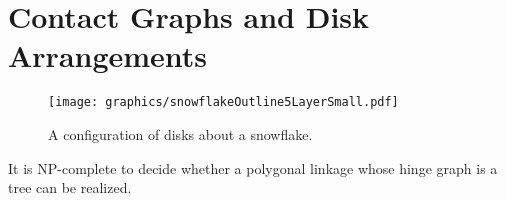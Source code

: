 \section{Contact Graphs and Disk Arrangements}



\begin{figure}[!htbp]
\begin{center}
\texttt{[image: graphics/snowflakeOutline5LayerSmall.pdf]}
\caption{A configuration of disks about a snowflake.}\label{fig:snowflakeOutline5Layer}
\end{center}
\end{figure}

\begin{thm}\label{thm:ContactGraphV3-1}
It is NP-complete to decide whether a polygonal linkage whose hinge graph is a tree can be realized.
\end{thm} 